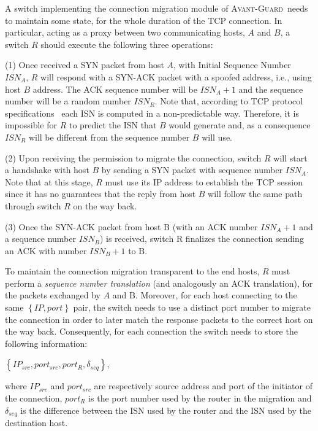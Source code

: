 \documentclass{sig-alternate}
\newcommand{\avantguard}{\textsc{Avant-Guard}}
\begin{document}
A switch implementing the connection migration module of \avantguard~needs to maintain some state, for the whole duration of the TCP connection.
In particular, acting as a proxy between two communicating hosts, $A$ and $B$, a switch $R$ should execute the following three operations: 

		(1) Once received a SYN packet from host $A$, with Initial Sequence Number~\cite{RFC793} $ISN_A$, $R$ will respond with a SYN-ACK packet with a spoofed address, i.e., using host $B$ address. The ACK sequence number will be $ISN_A+1$ and the sequence number will be a random number $ISN_R$. Note that, according to TCP protocol specifications~\cite{RFC6528, Morris1985} each ISN is computed in a non-predictable way. Therefore, it is impossible for $R$ to predict the ISN that $B$ would generate and, as a consequence $ISN_R$ will be different from the sequence number $B$ will use.
		
		(2) Upon receiving the permission to migrate the connection, switch $R$ will start a handshake with host $B$ by sending a SYN packet with sequence number $ISN_A$. Note that at this stage, $R$ must use its IP address to establish the TCP session since it has no guarantees that the reply from host $B$ will follow the same path through switch $R$ on the way back. 
		
		(3) Once the SYN-ACK packet from host B (with an ACK number $ISN_A+1$ and a sequence number $ISN_B$) is received, switch R finalizes the connection sending an ACK with number $ISN_B+1$ to B.
		
To maintain the connection migration transparent to the end hosts, $R$ must perform a {\em sequence number translation} (and analogously an ACK translation), for the packets exchanged by $A$ and B. Moreover, for each host connecting to the same $\left\{ {IP, port} \right\}$ pair, the switch needs to use a distinct port number to migrate the connection in order to later match the response packets to the correct host on the way back.
Consequently, for each connection the switch needs to store the following information:

\begin{center}
	$\left\{ {IP_{src}, port_{src}, port_R, \delta_{seq}} \right\}$,
\end{center}

where $IP_{src}$ and $port_{src}$ are respectively source address and port of the initiator of the connection, 
$port_R$ is the port number used by the router in the migration and $\delta_{seq}$ is the difference between the ISN used by the router and the ISN used by the destination host.
\end{document}
